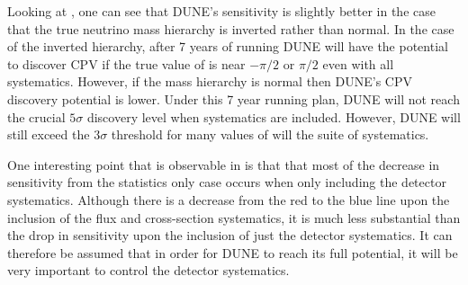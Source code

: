 Looking at , one can see that DUNE's sensitivity is slightly better in the case that the true neutrino mass hierarchy is inverted rather than normal.
In the case of the inverted hierarchy, after 7 years of running DUNE will have the potential to discover CPV if the true value of \dcp is near $-\pi/2$ or $\pi/2$ even with all systematics.
However, if the mass hierarchy is normal then DUNE's CPV discovery potential is lower. 
Under this 7 year running plan, DUNE will not reach the crucial $5\sigma$ discovery level when systematics are included. 
However, DUNE will still exceed the $3\sigma$ threshold for many values of \dcp will the suite of systematics.

One interesting point that is observable in  is that that most of the decrease in sensitivity from the statistics only case occurs when only including the detector systematics.
Although there is a decrease from the red to the blue line upon the inclusion of the flux and cross-section systematics, it is much less substantial than the drop in sensitivity upon the inclusion of just the detector systematics.
It can therefore be assumed that in order for DUNE to reach its full potential, it will be very important to control the detector systematics.
